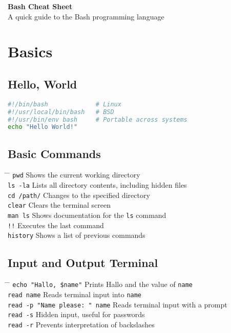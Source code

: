 \documentclass[a4paper,10pt]{article}
\begin{document}
\begin{center}
	{\LARGE \textbf{Bash Cheat Sheet}} \\[1em]
	{\large A quick guide to the Bash programming language}
\end{center}

\vspace{0.5cm}

\section{Basics}
\subsection{Hello, World}
\begin{lstlisting}[language=bash]
#!/bin/bash             # Linux
#!/usr/local/bin/bash   # BSD
#!/usr/bin/env bash     # Portable across systems
echo "Hello World!"
\end{lstlisting}

\subsection{Basic Commands}
\begin{tabbing}
	\= \hspace{30mm} \= \hspace{50mm} \kill
	\> \verb|pwd| \> Shows the current working directory \\
	\> \verb|ls -la| \> Lists all directory contents, including hidden files \\
	\> \verb|cd /path/| \> Changes to the specified directory \\
	\> \verb|clear| \> Clears the terminal screen \\
	\> \verb|man ls| \> Shows documentation for the \verb|ls| command \\
	\> \verb|!!| \> Executes the last command \\
	\> \verb|history| \> Shows a list of previous commands \\
\end{tabbing}

\subsection{Input and Output Terminal}
\begin{tabbing}
	\= \hspace{30mm} \= \hspace{50mm} \kill
	\> \verb|echo "Hallo, $name"| \> Prints Hallo and the value of \verb|name| \\
	\> \verb|read name| \> Reads terminal input into \verb|name| \\
	\> \verb|read -p "Name please: " name| \> Reads terminal input with a prompt \\
	\> \verb|read -s| \> Hidden input, useful for passwords \\
	\> \verb|read -r| \> Prevents interpretation of backslashes \\
\end{tabbing}
\end{document}

